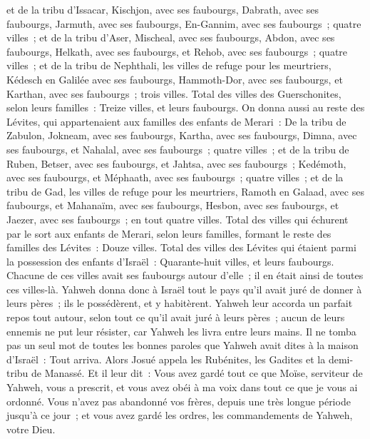 \begin{multicols}{2}
et de la tribu d'Issacar, Kischjon, avec ses faubourgs, Dabrath, avec ses faubourgs,
Jarmuth, avec ses faubourgs, En-Gannim, avec ses faubourgs~; quatre villes~;
et de la tribu d'Aser, Mischeal, avec ses faubourgs, Abdon, avec ses faubourgs,
Helkath, avec ses faubourgs, et Rehob, avec ses faubourgs~; quatre villes~;
et de la tribu de Nephthali, les villes de refuge pour les meurtriers, Kédesch en Galilée avec ses faubourgs, Hammoth-Dor, avec ses faubourgs, et Karthan, avec ses faubourgs~; trois villes.
Total des villes des Guerschonites, selon leurs familles~: Treize villes, et leurs faubourgs.
On donna aussi au reste des Lévites, qui appartenaient aux familles des enfants de Merari~: De la tribu de Zabulon, Jokneam, avec ses faubourgs, Kartha, avec ses faubourgs,
Dimna, avec ses faubourgs, et Nahalal, avec ses faubourgs~; quatre villes~;
et de la tribu de Ruben, Betser, avec ses faubourgs, et Jahtsa, avec ses faubourgs~;
Kedémoth, avec ses faubourgs, et Méphaath, avec ses faubourgs~; quatre villes~;
et de la tribu de Gad, les villes de refuge pour les meurtriers, Ramoth en Galaad, avec ses faubourgs, et Mahanaïm, avec ses faubourgs,
Hesbon, avec ses faubourgs, et Jaezer, avec ses faubourgs~; en tout quatre villes.
Total des villes qui échurent par le sort aux enfants de Merari, selon leurs familles, formant le reste des familles des Lévites~: Douze villes.
Total des villes des Lévites qui étaient parmi la possession des enfants d'Israël~: Quarante-huit villes, et leurs faubourgs.
Chacune de ces villes avait ses faubourgs autour d'elle~; il en était ainsi de toutes ces villes-là.
Yahweh donna donc à Israël tout le pays qu'il avait juré de donner à leurs pères~; ils le possédèrent, et y habitèrent.
Yahweh leur accorda un parfait repos tout autour, selon tout ce qu'il avait juré à leurs pères~; aucun de leurs ennemis ne put leur résister, car Yahweh les livra entre leurs mains.
Il ne tomba pas un seul mot de toutes les bonnes paroles que Yahweh avait dites à la maison d'Israël~: Tout arriva.
\VerseOne{}Alors Josué appela les Rubénites, les Gadites et la demi-tribu de Manassé.
Et il leur dit~: Vous avez gardé tout ce que Moïse, serviteur de Yahweh, vous a prescrit, et vous avez obéi à ma voix dans tout ce que je vous ai ordonné.
Vous n'avez pas abandonné vos frères, depuis une très longue période jusqu'à ce jour~; et vous avez gardé les ordres, les commandements de Yahweh, votre Dieu.

\end{multicols}
